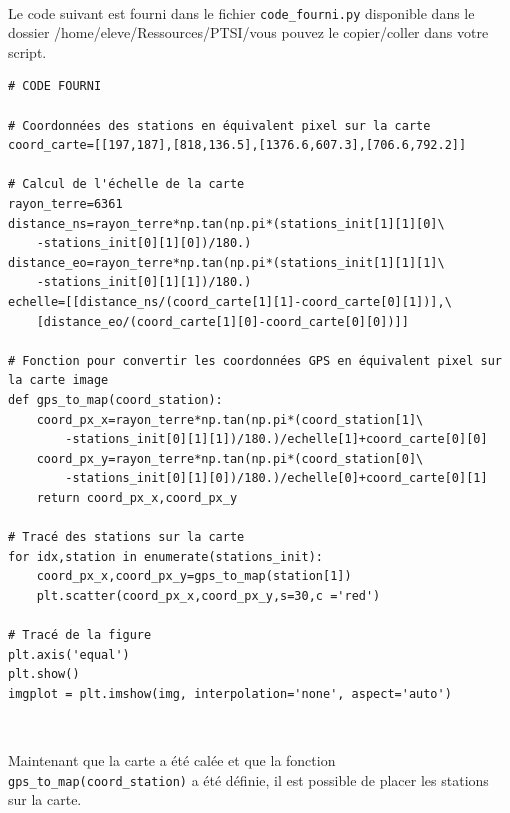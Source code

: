 
~\

Le code suivant est fourni dans le fichier \verb?code_fourni.py? disponible dans le dossier \og/home/eleve/Ressources/PTSI/\fg vous pouvez le copier/coller dans votre script.

\begin{verbatim}
# CODE FOURNI

# Coordonnées des stations en équivalent pixel sur la carte
coord_carte=[[197,187],[818,136.5],[1376.6,607.3],[706.6,792.2]]

# Calcul de l'échelle de la carte
rayon_terre=6361
distance_ns=rayon_terre*np.tan(np.pi*(stations_init[1][1][0]\
	-stations_init[0][1][0])/180.)
distance_eo=rayon_terre*np.tan(np.pi*(stations_init[1][1][1]\
	-stations_init[0][1][1])/180.)
echelle=[[distance_ns/(coord_carte[1][1]-coord_carte[0][1])],\
	[distance_eo/(coord_carte[1][0]-coord_carte[0][0])]]

# Fonction pour convertir les coordonnées GPS en équivalent pixel sur la carte image
def gps_to_map(coord_station):
    coord_px_x=rayon_terre*np.tan(np.pi*(coord_station[1]\
    	-stations_init[0][1][1])/180.)/echelle[1]+coord_carte[0][0]
    coord_px_y=rayon_terre*np.tan(np.pi*(coord_station[0]\
    	-stations_init[0][1][0])/180.)/echelle[0]+coord_carte[0][1]
    return coord_px_x,coord_px_y

# Tracé des stations sur la carte
for idx,station in enumerate(stations_init):
    coord_px_x,coord_px_y=gps_to_map(station[1])
    plt.scatter(coord_px_x,coord_px_y,s=30,c ='red')

# Tracé de la figure
plt.axis('equal')
plt.show()
imgplot = plt.imshow(img, interpolation='none', aspect='auto')

\end{verbatim}


~\

Maintenant que la carte a été calée et que la fonction \verb?gps_to_map(coord_station)? a été définie, il est possible de placer les stations sur la carte.


